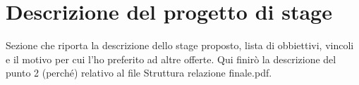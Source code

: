 \section{Descrizione del progetto di stage}

Sezione che riporta la descrizione dello stage proposto, lista di obbiettivi, vincoli e il motivo per cui l'ho preferito ad altre offerte.
Qui finirò la descrizione del punto 2 (perché) relativo al file Struttura relazione finale.pdf.
